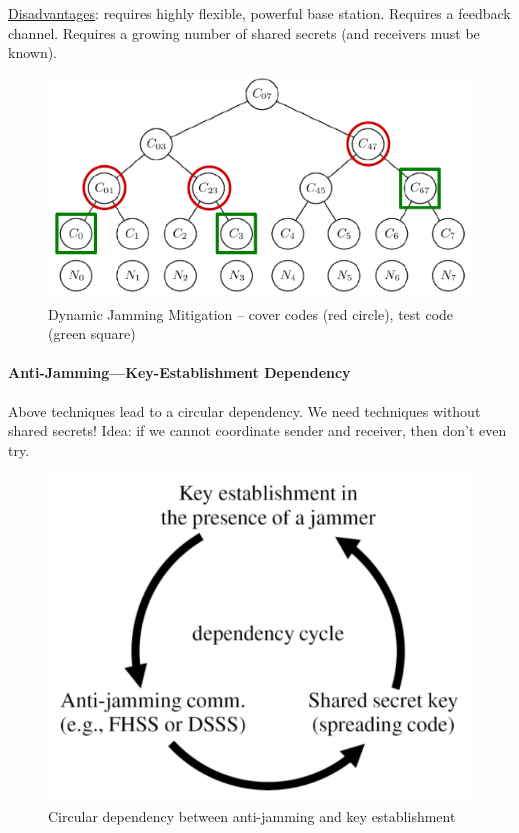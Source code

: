 \underline{Disadvantages}:
requires highly flexible, powerful base station.
Requires a feedback channel.
Requires a growing number of shared secrets (and receivers must be known).

\begin{figure}[h]
	\centering
	\includegraphics[scale=1.4]{images/3-chiang.png}
	\caption{Dynamic Jamming Mitigation -- cover codes (red circle), test code (green square)}
	\label{fig:chiang}
\end{figure}

\paragraph{Anti-Jamming---Key-Establishment Dependency}
Above techniques lead to a circular dependency.
We need techniques without shared secrets!
Idea: if we cannot coordinate sender and receiver, then don't even try.

\begin{figure}[h]
	\centering
	\includegraphics[scale=0.4]{images/3-jamming-key-cycle.png}
	\caption{Circular dependency between anti-jamming and key establishment}
	\label{fig:jamming-key-cycle}
\end{figure}

